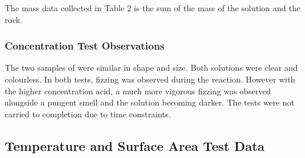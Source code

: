 \begin{table}[H]
\begin{minipage}[t]{0.46\textwidth}
        {
            \aboverulesep=0pt
            \belowrulesep=0pt
        }
    \end{minipage}
\end{table}

The mass data collected in Table 2 is the sum of the mass of the  solution and the  rock.
\subsubsection{Concentration Test Observations}
The two samples of  were similar in shape and size. Both  solutions were clear and colourless.
In both tests, fizzing was observed during the reaction. However with the higher concentration acid, a much more vigorous fizzing was observed alongside a pungent smell and the solution becoming darker.
The tests were not carried to completion due to time constraints.

\subsection{Temperature and Surface Area Test Data}
